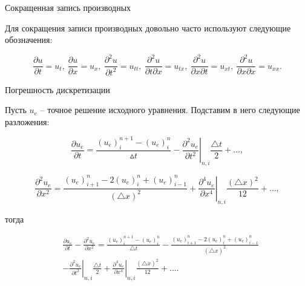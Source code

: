 \documentclass[10pt,xcolor=pst,aspectratio=169]{beamer}
\begin{document}
\begin{frame}{Сокращенная запись производных}

	\transdissolve[duration=0.1]
	\justifying
	\large

    Для сокращения записи производных довольно часто используют следующие обозначения:

    \[
        \frac{\partial u}{\partial t} = u_{t}, \: \frac{\partial u}{\partial x} = u_{x}, \: \frac{\partial^{2} u}{\partial t^{2}} = u_{tt}, \: \frac{\partial^{2} u}{\partial t \partial x} = u_{tx}, \: \frac{\partial^{2} u}{\partial x \partial t} = u_{xt}, \: \frac{\partial^{2} u}{\partial x \partial x} = u_{xx}.
    \]

\end{frame}

\begin{frame}{Погрешность дискретизации}

	\transdissolve[duration=0.1]
	\justifying
	\large

    Пусть $u_{e}$ -- точное решение исходного уравнения. Подставим в него следующие разложения:

    \[
        \frac{\partial u_{e}}{\partial t} = \frac{\left( u_{e} \right)^{n + 1}_{i} - \left( u_{e} \right)^{n}_{i}}{\vartriangle t} - \left. \frac{\partial^{2} u_{e}}{\partial t^{2}} \right|_{n, i} \frac{\triangle t}{2} + \ldots ,
    \]

    \[
        \frac{\partial^{2} u_{e}}{\partial x^{2}} = \frac{\left( u_{e} \right)^{n}_{i + 1} - 2 \left( u_{e} \right)^{n}_{i} + \left( u_{e} \right)^{n}_{i - 1}}{\left( \triangle x \right)^{2}} + \left. \frac{\partial^{4} u_{e}}{\partial x^{4}} \right|_{n, i} \frac{\left( \triangle x \right)^{2}}{12} + \ldots ,
    \]

    тогда

    \[
        \begin{split}
            &\frac{\partial u_{e}}{\partial t} - \frac{\partial^{2} u_{e}}{\partial x^{2}} = \frac{\left( u_{e} \right)^{n + 1}_{i} - \left( u_{e} \right)^{n}_{i}}{\triangle t} - \frac{\left( u_{e} \right)^{n}_{i + 1} - 2 \left( u_{e} \right)^{n}_{i} + \left( u_{e} \right)^{n}_{i - 1}}{\left(\triangle x\right)^{2}} \\
            &- \left. \frac{\partial^{2} u_{e}}{\partial t^{2}} \right|_{n, i} \frac{\triangle t}{2} + \left. \frac{\partial^{4} u_{e}}{\partial x^{4}} \right|_{n, i} \frac{\left( \triangle x \right)^{2}}{12} + \ldots.
        \end{split}
    \]

\end{frame}
\end{document}
